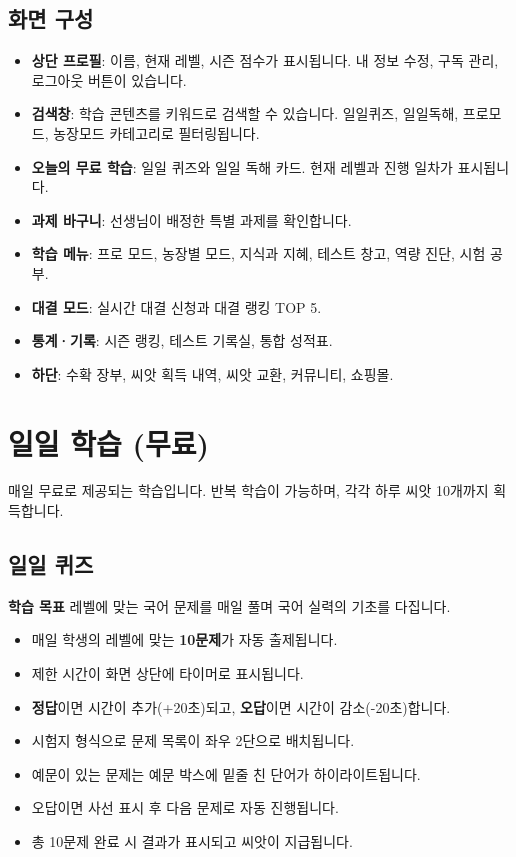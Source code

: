 \documentclass[11pt,a4paper]{article}
\newcommand{\goalbox}[1]{%
  \vspace{0.3cm}
  \noindent\colorbox{lightbg}{\parbox{\dimexpr\textwidth-2\fboxsep}{%
    \textbf{\color{korfarm}학습 목표} \quad #1%
  }}
  \vspace{0.3cm}
}
\begin{document}
\subsection{화면 구성}
\begin{itemize}[nosep,leftmargin=*]
  \item \textbf{상단 프로필}: 이름, 현재 레벨, 시즌 점수가 표시됩니다. 내 정보 수정, 구독 관리, 로그아웃 버튼이 있습니다.
  \item \textbf{검색창}: 학습 콘텐츠를 키워드로 검색할 수 있습니다. 일일퀴즈, 일일독해, 프로모드, 농장모드 카테고리로 필터링됩니다.
  \item \textbf{오늘의 무료 학습}: 일일 퀴즈와 일일 독해 카드. 현재 레벨과 진행 일차가 표시됩니다.
  \item \textbf{과제 바구니}: 선생님이 배정한 특별 과제를 확인합니다.
  \item \textbf{학습 메뉴}: 프로 모드, 농장별 모드, 지식과 지혜, 테스트 창고, 역량 진단, 시험 공부.
  \item \textbf{대결 모드}: 실시간 대결 신청과 대결 랭킹 TOP 5.
  \item \textbf{통계·기록}: 시즌 랭킹, 테스트 기록실, 통합 성적표.
  \item \textbf{하단}: 수확 장부, 씨앗 획득 내역, 씨앗 교환, 커뮤니티, 쇼핑몰.
\end{itemize}

\newpage
\section{일일 학습 (무료)}

매일 무료로 제공되는 학습입니다. 반복 학습이 가능하며, 각각 하루 씨앗 10개까지 획득합니다.

\subsection{일일 퀴즈}
\goalbox{레벨에 맞는 국어 문제를 매일 풀며 국어 실력의 기초를 다집니다.}
\begin{itemize}[nosep,leftmargin=*]
  \item 매일 학생의 레벨에 맞는 \textbf{10문제}가 자동 출제됩니다.
  \item 제한 시간이 화면 상단에 타이머로 표시됩니다.
  \item \textbf{정답}이면 시간이 추가(+20초)되고, \textbf{오답}이면 시간이 감소(-20초)합니다.
  \item 시험지 형식으로 문제 목록이 좌우 2단으로 배치됩니다.
  \item 예문이 있는 문제는 예문 박스에 밑줄 친 단어가 하이라이트됩니다.
  \item 오답이면 사선 표시 후 다음 문제로 자동 진행됩니다.
  \item 총 10문제 완료 시 결과가 표시되고 씨앗이 지급됩니다.
\end{itemize}
\end{document}
